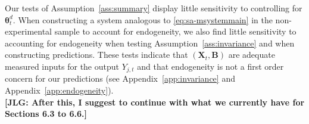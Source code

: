 \noindent Our tests of Assumption~\ref{ass:summary} display little sensitivity to controlling for $\bm{\theta}_{t}^d$. When constructing a system analogous to \eqref{eq:sa-msystemmain} in the non-experimental sample to account for endogeneity, we also find little sensitivity to accounting for endogeneity when testing Assumption~\ref{ass:invariance} and when constructing predictions. These tests indicate that  $\left( \bm{X}_{t}, \bm{B} \right)$ are adequate measured inputs for the output $Y_{j,t}$ and that endogeneity is not a first order concern for our predictions (see Appendix~\ref{app:invariance} and Appendix~\ref{app:endogeneity}).\\

\noindent \textbf{[JLG: After this, I suggest to continue with what we currently have for Sections 6.3 to 6.6.]}

\singlespace



 